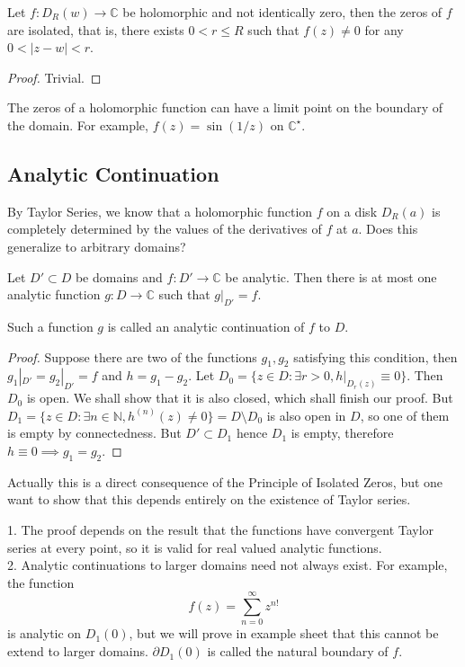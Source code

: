 \begin{theorem}
    Let $f:D_R(w)\to\mathbb C$ be holomorphic and not identically zero, then the zeros of $f$ are isolated, that is, there exists $0<r\le R$ such that $f(z)\neq 0$ for any $0<|z-w|<r$.
\end{theorem}
\begin{proof}
    Trivial.
\end{proof}
\begin{remark}
    The zeros of a holomorphic function can have a limit point on the boundary of the domain.
    For example, $f(z)=\sin(1/z)$ on $\mathbb C^\star$.
\end{remark}
\subsection{Analytic Continuation}
By Taylor Series, we know that a holomorphic function $f$ on a disk $D_R(a)$ is completely determined by the values of the derivatives of $f$ at $a$.
Does this generalize to arbitrary domains?
\begin{theorem}
    Let $D'\subset D$ be domains and $f:D'\to\mathbb C$ be analytic.
    Then there is at most one analytic function $g:D\to\mathbb C$ such that $g|_{D'}=f$.
\end{theorem}
Such a function $g$ is called an analytic continuation of $f$ to $D$.
\begin{proof}
    Suppose there are two of the functions $g_1,g_2$ satisfying this condition, then $g_1|_{D'}=g_2|_{D'}=f$ and $h=g_1-g_2$.
    Let $D_0=\{z\in D:\exists r>0, h|_{D_r(z)}\equiv 0\}$.
    Then $D_0$ is open.
    We shall show that it is also closed, which shall finish our proof.
    But $D_1=\{z\in D:\exists n\in\mathbb N, h^{(n)}(z)\neq 0\}=D\setminus D_0$ is also open in $D$, so one of them is empty by connectedness.
    But $D'\subset D_1$ hence $D_1$ is empty, therefore $h\equiv 0\implies g_1=g_2$.
\end{proof}
Actually this is a direct consequence of the Principle of Isolated Zeros, but one want to show that this depends entirely on the existence of Taylor series.
\begin{remark}
    1. The proof depends on the result that the functions have convergent Taylor series at every point, so it is valid for real valued analytic functions.\\
    2. Analytic continuations to larger domains need not always exist.
    For example, the function
    $$f(z)=\sum_{n=0}^\infty z^{n!}$$
    is analytic on $D_1(0)$, but we will prove in example sheet that this cannot be extend to larger domains.
    $\partial D_1(0)$ is called the natural boundary of $f$.
\end{remark}
